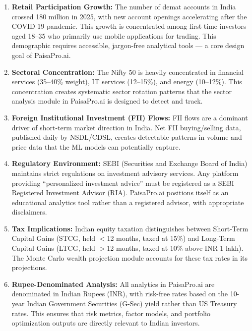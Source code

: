 \documentclass[12pt, a4paper, oneside]{report}
\newcommand{\projectname}{PaisaPro.ai}
\begin{document}
\begin{enumerate}
    \item \textbf{Retail Participation Growth:} The number of demat accounts in India crossed 180 million in 2025, with new account openings accelerating after the COVID-19 pandemic. This growth is concentrated among first-time investors aged 18--35 who primarily use mobile applications for trading. This demographic requires accessible, jargon-free analytical tools --- a core design goal of \projectname{}.

    \item \textbf{Sectoral Concentration:} The Nifty 50 is heavily concentrated in financial services (35--40\% weight), IT services (12--15\%), and energy (10--12\%). This concentration creates systematic sector rotation patterns that the sector analysis module in \projectname{} is designed to detect and track.

    \item \textbf{Foreign Institutional Investment (FII) Flows:} FII flows are a dominant driver of short-term market direction in India. Net FII buying/selling data, published daily by NSDL/CDSL, creates detectable patterns in volume and price data that the ML models can potentially capture.

    \item \textbf{Regulatory Environment:} SEBI (Securities and Exchange Board of India) maintains strict regulations on investment advisory services. Any platform providing ``personalized investment advice'' must be registered as a SEBI Registered Investment Advisor (RIA). \projectname{} positions itself as an educational analytics tool rather than a registered advisor, with appropriate disclaimers.

    \item \textbf{Tax Implications:} Indian equity taxation distinguishes between Short-Term Capital Gains (STCG, held $<$12 months, taxed at 15\%) and Long-Term Capital Gains (LTCG, held $>$12 months, taxed at 10\% above INR 1 lakh). The Monte Carlo wealth projection module accounts for these tax rates in its projections.

    \item \textbf{Rupee-Denominated Analysis:} All analytics in \projectname{} are denominated in Indian Rupees (INR), with risk-free rates based on the 10-year Indian Government Securities (G-Sec) yield rather than US Treasury rates. This ensures that risk metrics, factor models, and portfolio optimization outputs are directly relevant to Indian investors.
\end{enumerate}
\end{document}
